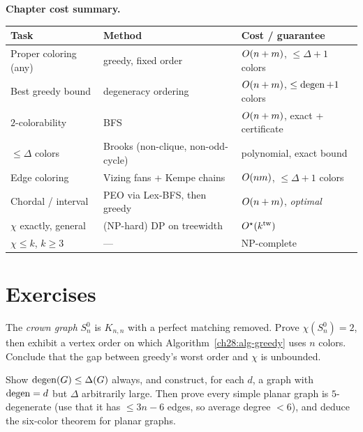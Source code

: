 \begin{complexitybox}
\textbf{Chapter cost summary.}
\begin{center}
\begin{tabular}{lll}
\toprule
Task & Method & Cost / guarantee\\
\midrule
Proper coloring (any) & greedy, fixed order & $O(n+m)$, $\le\Delta+1$ colors\\
Best greedy bound & degeneracy ordering & $O(n+m)$, $\le\operatorname{degen}+1$ colors\\
$2$-colorability & BFS & $O(n+m)$, exact + certificate\\
$\le\Delta$ colors & Brooks (non-clique, non-odd-cycle) & polynomial, exact bound\\
Edge coloring & Vizing fans + Kempe chains & $O(nm)$, $\le\Delta+1$ colors\\
Chordal / interval & PEO via Lex-BFS, then greedy & $O(n+m)$, \emph{optimal}\\
$\chi$ exactly, general & (NP-hard) DP on treewidth & $O^\star(k^{\operatorname{tw}})$\\
$\chi\le k$, $k\ge 3$ & --- & NP-complete\\
\bottomrule
\end{tabular}
\end{center}
\end{complexitybox}

\section{Exercises}
\label{ch28:exercises}

\begin{exercise}
\label{ch28:ex-crown}
The \emph{crown graph} $S_n^0$ is $K_{n,n}$ with a perfect matching removed. Prove
$\chi(S_n^0)=2$, then exhibit a vertex order on which Algorithm~\ref{ch28:alg-greedy} uses
$n$ colors. Conclude that the gap between greedy's worst order and $\chi$ is
unbounded.
\end{exercise}

\begin{exercise}
\label{ch28:ex-degen}
Show $\operatorname{degen}(G)\le\Delta(G)$ always, and construct, for each $d$, a graph with
$\operatorname{degen}=d$ but $\Delta$ arbitrarily large. Then prove every simple planar graph is
$5$-degenerate (use that it has $\le 3n-6$ edges, so average degree $<6$), and
deduce the six-color theorem for planar graphs.
\end{exercise}


